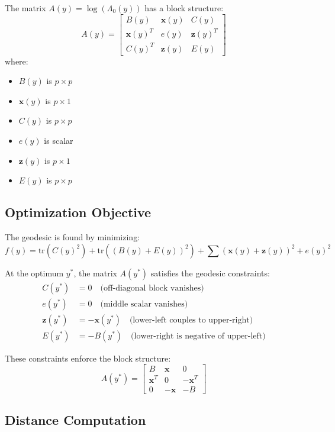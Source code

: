 \documentclass{article}
\begin{document}
The matrix $A(y) = \log(\Lambda_0(y))$ has a block structure:
\[
A(y) = \begin{bmatrix}
B(y) & \mathbf{x}(y) & C(y) \\
\mathbf{x}(y)^T & e(y) & \mathbf{z}(y)^T \\
C(y)^T & \mathbf{z}(y) & E(y)
\end{bmatrix}
\]
where:
\begin{itemize}
  \item $B(y)$ is $p \times p$
  \item $\mathbf{x}(y)$ is $p \times 1$
  \item $C(y)$ is $p \times p$
  \item $e(y)$ is scalar
  \item $\mathbf{z}(y)$ is $p \times 1$
  \item $E(y)$ is $p \times p$
\end{itemize}

\subsection{Optimization Objective}

The geodesic is found by minimizing:
\begin{equation}
f(y) = \text{tr}(C(y)^2) + \text{tr}((B(y) + E(y))^2) + \sum(\mathbf{x}(y) + \mathbf{z}(y))^2 + e(y)^2
\label{eq:objective}
\end{equation}

At the optimum $y^*$, the matrix $A(y^*)$ satisfies the geodesic constraints:
\begin{align}
C(y^*) &= 0 \quad \text{(off-diagonal block vanishes)} \\
e(y^*) &= 0 \quad \text{(middle scalar vanishes)} \\
\mathbf{z}(y^*) &= -\mathbf{x}(y^*) \quad \text{(lower-left couples to upper-right)} \\
E(y^*) &= -B(y^*) \quad \text{(lower-right is negative of upper-left)}
\end{align}

These constraints enforce the block structure:
\[
A(y^*) = \begin{bmatrix}
B & \mathbf{x} & 0 \\
\mathbf{x}^T & 0 & -\mathbf{x}^T \\
0 & -\mathbf{x} & -B
\end{bmatrix}
\]

\subsection{Distance Computation}
\end{document}
